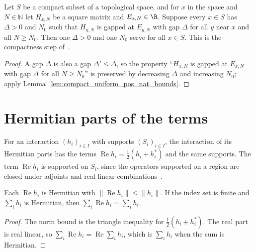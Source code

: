 \begin{theorem}
    \label{thm:hamiltonians_uniform_gap_compact}
    \leanok
    Let $S$ be a compact subset of a topological space, and for $x$ in the
    space and $N\in\mathbb N$ let $H_{x,N}$ be a square matrix and
    $E_{x,N}\in\R$. Suppose every $x\in S$ has $\Delta>0$ and $N_0$ such that
    $H_{y,N}$ is gapped at $E_{y,N}$ with gap $\Delta$ for all $y$ near $x$ and
    all $N\ge N_0$. Then one $\Delta>0$ and one $N_0$ serve for all $x\in S$.
    This is the compactness step of~\cite[Appendix~A]{Schuch2011Phases}.
\end{theorem}
\begin{proof}\leanok
    A gap $\Delta$ is also a gap $\Delta'\le\Delta$, so the property
    ``$H_{x,N}$ is gapped at $E_{x,N}$ with gap $\Delta$ for all $N\ge N_0$''
    is preserved by decreasing $\Delta$ and increasing $N_0$;
    apply Lemma~\ref{lem:compact_uniform_pos_nat_bounds}.
\end{proof}

\section{Hermitian parts of the terms}
\label{sec:hamiltonians_hermitian_part}

\begin{definition}
    \label{def:hamiltonians_hermitian_part}
    \leanok
    For an interaction $(h_i)_{i\in I}$ with supports $(S_i)_{i\in I}$, the
    interaction of its Hermitian parts has the terms
    $\operatorname{Re}h_i=\tfrac12(h_i+h_i^*)$ and the same supports. The term
    $\operatorname{Re}h_i$ is supported on $S_i$, since the operators supported
    on a region are closed under adjoints and real linear
    combinations~\cite{OpenAI2026PolynomialPEPS}.
\end{definition}

\begin{lemma}
    \label{lem:hamiltonians_hermitian_part}
    \leanok
    Each $\operatorname{Re}h_i$ is Hermitian with
    $\lVert\operatorname{Re}h_i\rVert\le\lVert h_i\rVert$. If the index set is
    finite and $\sum_ih_i$ is Hermitian, then
    $\sum_i\operatorname{Re}h_i=\sum_ih_i$.
\end{lemma}
\begin{proof}\leanok
    The norm bound is the triangle inequality for
    $\tfrac12(h_i+h_i^*)$. The real part is real linear, so
    $\sum_i\operatorname{Re}h_i=\operatorname{Re}\sum_ih_i$, which is
    $\sum_ih_i$ when the sum is Hermitian.
\end{proof}

